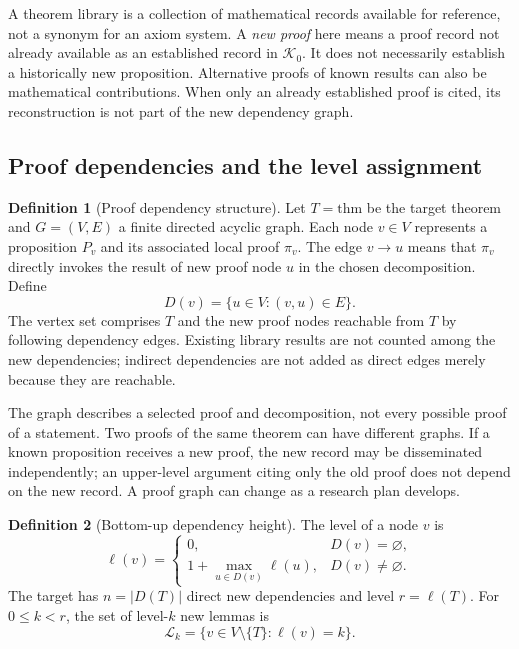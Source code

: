 \documentclass[11pt,a4paper]{article}
\theoremstyle{definition}\newtheorem{definition}{Definition}
\newcommand{\K}{\mathcal K}
\newcommand{\Lset}{\mathcal L}
\begin{document}
A theorem library is a collection of mathematical records available for reference, not a synonym for an axiom system. A \emph{new proof} here means a proof record not already available as an established record in $\K_0$. It does not necessarily establish a historically new proposition. Alternative proofs of known results can also be mathematical contributions. When only an already established proof is cited, its reconstruction is not part of the new dependency graph.

\subsection{Proof dependencies and the level assignment}
\begin{definition}[Proof dependency structure]
Let $T=\mathrm{thm}$ be the target theorem and $G=(V,E)$ a finite directed acyclic graph. Each node $v\in V$ represents a proposition $P_v$ and its associated local proof $\pi_v$. The edge $v\to u$ means that $\pi_v$ directly invokes the result of new proof node $u$ in the chosen decomposition. Define
\[
 D(v)=\{u\in V:(v,u)\in E\}.
\]
The vertex set comprises $T$ and the new proof nodes reachable from $T$ by following dependency edges. Existing library results are not counted among the new dependencies; indirect dependencies are not added as direct edges merely because they are reachable.
\end{definition}

The graph describes a selected proof and decomposition, not every possible proof of a statement. Two proofs of the same theorem can have different graphs. If a known proposition receives a new proof, the new record may be disseminated independently; an upper-level argument citing only the old proof does not depend on the new record. A proof graph can change as a research plan develops.

\begin{definition}[Bottom-up dependency height]\label{def:height}
The level of a node $v$ is
\begin{equation}\label{eq:level}
 \boxed{\ell(v)=\begin{cases}
 0,&D(v)=\varnothing,\\[3pt]
 1+\displaystyle\max_{u\in D(v)}\ell(u),&D(v)\ne\varnothing.
 \end{cases}}
\end{equation}
The target has $n=|D(T)|$ direct new dependencies and level $r=\ell(T)$. For $0\le k<r$, the set of level-$k$ new lemmas is
\[
 \Lset_k=\{v\in V\setminus\{T\}:\ell(v)=k\}.
\]
\end{definition}
\end{document}
